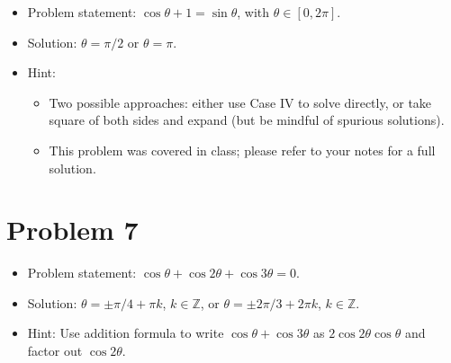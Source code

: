 \documentclass{amsart}
\begin{document}
\begin{itemize}
  \item Problem statement: $\cos \theta + 1  = \sin \theta$, with $\theta \in [0, 2\pi]$.
  \item Solution: $\theta = \pi/2$ or $\theta = \pi$.
  \item Hint:
    \begin{itemize}
    \item Two possible approaches: either use Case IV to solve directly, or take square of both sides and expand (but be mindful of spurious solutions).
    \item This problem was covered in class; please refer to your notes for a full solution.

    \end{itemize}
  \end{itemize}  

  \section*{Problem 7}

\begin{itemize}
  \item Problem statement: $\cos \theta + \cos 2\theta + \cos 3 \theta = 0$.
  \item Solution: $\theta = \pm \pi/4 + \pi k$, $k \in \mathbb{Z}$, or $\theta = \pm 2\pi/3 + 2\pi k$, $k \in \mathbb{Z}$.
  \item Hint: Use addition formula to write $\cos \theta + \cos 3 \theta$ as $2 \cos 2\theta \cos \theta$ and factor out $\cos 2 \theta$.
    
  \end{itemize}  
\end{document}
